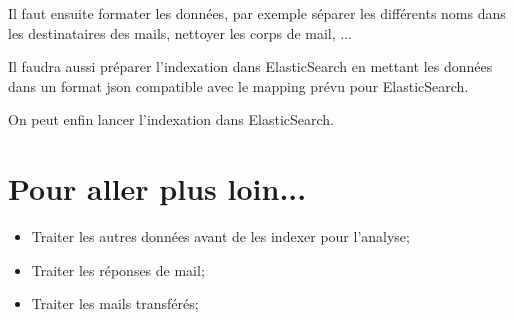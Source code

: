 \documentclass[11pt,letterpaper]{article}
\begin{document}
	Il faut ensuite formater les données, par exemple séparer les différents noms dans les destinataires des mails, nettoyer les corps de mail, ...
	
	Il faudra aussi préparer l'indexation dans ElasticSearch en mettant les données dans un format json compatible avec le mapping prévu pour ElasticSearch.

	On peut enfin lancer l'indexation dans ElasticSearch.
	\section*{Pour aller plus loin...}
	\begin{itemize}
		\item Traiter les autres données avant de les indexer pour l'analyse;
		\item Traiter les réponses de mail;
		\item Traiter les mails transférés;
	\end{itemize}
\end{document}
